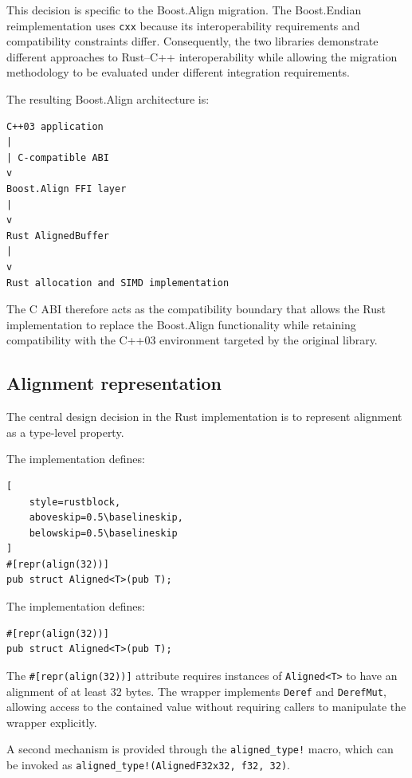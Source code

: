 This decision is specific to the Boost.Align migration. The Boost.Endian reimplementation uses \texttt{cxx} because its 
interoperability requirements and compatibility constraints differ. Consequently, the two libraries demonstrate 
different approaches to Rust--C++ interoperability while allowing the migration methodology to be evaluated under 
different integration requirements.

The resulting Boost.Align architecture is:

\begin{verbatim}
C++03 application
|
| C-compatible ABI
v
Boost.Align FFI layer
|
v
Rust AlignedBuffer
|
v
Rust allocation and SIMD implementation
\end{verbatim}

The C ABI therefore acts as the compatibility boundary that allows the Rust implementation to replace the Boost.Align 
functionality while retaining compatibility with the C++03 environment targeted by the original library.


\subsection{Alignment representation}

The central design decision in the Rust implementation is to represent alignment as a type-level property.

The implementation defines:

\begin{lstlisting}[
    style=rustblock,
    aboveskip=0.5\baselineskip,
    belowskip=0.5\baselineskip
]
#[repr(align(32))]
pub struct Aligned<T>(pub T);
\end{lstlisting}

The implementation defines:

\begin{lstlisting}[style=rustblock]
#[repr(align(32))]
pub struct Aligned<T>(pub T);
\end{lstlisting}

The \lstinline|#[repr(align(32))]| attribute requires instances of \lstinline|Aligned<T>| to have an alignment of at 
least 32 bytes. The wrapper implements \lstinline|Deref| and \lstinline|DerefMut|, 
allowing access to the contained value without requiring callers to manipulate the wrapper explicitly.

A second mechanism is provided through the
\lstinline|aligned_type!| macro, which can be invoked as
\lstinline|aligned_type!(AlignedF32x32, f32, 32)|. 


